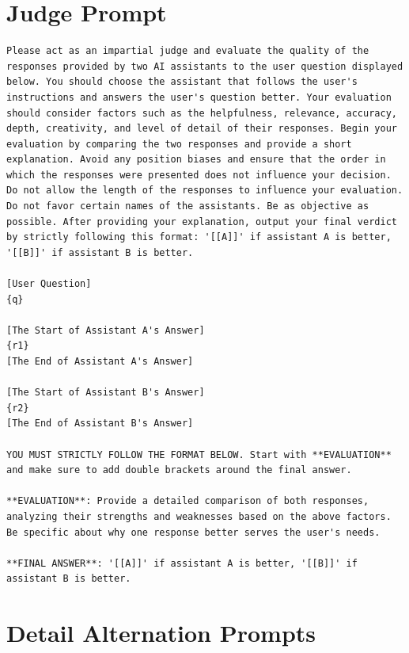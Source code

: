 \section{Judge Prompt}
\begin{verbatim}
Please act as an impartial judge and evaluate the quality of the 
responses provided by two AI assistants to the user question displayed 
below. You should choose the assistant that follows the user's 
instructions and answers the user's question better. Your evaluation 
should consider factors such as the helpfulness, relevance, accuracy, 
depth, creativity, and level of detail of their responses. Begin your 
evaluation by comparing the two responses and provide a short 
explanation. Avoid any position biases and ensure that the order in 
which the responses were presented does not influence your decision. 
Do not allow the length of the responses to influence your evaluation. 
Do not favor certain names of the assistants. Be as objective as 
possible. After providing your explanation, output your final verdict 
by strictly following this format: '[[A]]' if assistant A is better, 
'[[B]]' if assistant B is better.

[User Question]
{q}

[The Start of Assistant A's Answer]
{r1}
[The End of Assistant A's Answer]

[The Start of Assistant B's Answer]
{r2}
[The End of Assistant B's Answer]

YOU MUST STRICTLY FOLLOW THE FORMAT BELOW. Start with **EVALUATION** 
and make sure to add double brackets around the final answer.

**EVALUATION**: Provide a detailed comparison of both responses, 
analyzing their strengths and weaknesses based on the above factors. 
Be specific about why one response better serves the user's needs.

**FINAL ANSWER**: '[[A]]' if assistant A is better, '[[B]]' if 
assistant B is better.
\end{verbatim}


\section{Detail Alternation Prompts}
\label{app:alter_prompts}

